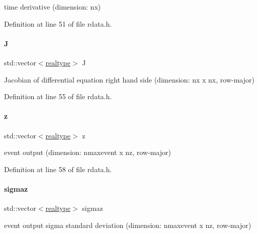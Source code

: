 time derivative (dimension\+: nx) 

Definition at line 51 of file rdata.\+h.

\mbox{\label{classamici_1_1_return_data_a6eee8c09315a85f7213d679fcb2aef85}} 
\paragraph{\texorpdfstring{J}{J}}
{\footnotesize\ttfamily std\+::vector$<$\mbox{\hyperlink{namespaceamici_a1bdce28051d6a53868f7ccbf5f2c14a3}{realtype}}$>$ J}

Jacobian of differential equation right hand side (dimension\+: nx x nx, row-\/major) 

Definition at line 55 of file rdata.\+h.

\mbox{\label{classamici_1_1_return_data_a8ed223273385c1e7fff94cfa8ca81d45}} 
\paragraph{\texorpdfstring{z}{z}}
{\footnotesize\ttfamily std\+::vector$<$\mbox{\hyperlink{namespaceamici_a1bdce28051d6a53868f7ccbf5f2c14a3}{realtype}}$>$ z}

event output (dimension\+: nmaxevent x nz, row-\/major) 

Definition at line 58 of file rdata.\+h.

\mbox{\label{classamici_1_1_return_data_adc3c5ee1620b079cd34137010873f500}} 
\paragraph{\texorpdfstring{sigmaz}{sigmaz}}
{\footnotesize\ttfamily std\+::vector$<$\mbox{\hyperlink{namespaceamici_a1bdce28051d6a53868f7ccbf5f2c14a3}{realtype}}$>$ sigmaz}

event output sigma standard deviation (dimension\+: nmaxevent x nz, row-\/major) 

